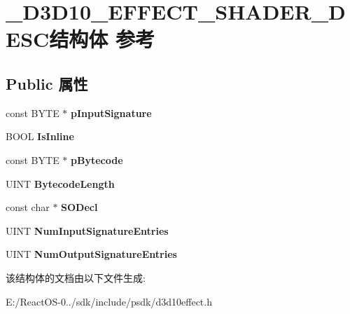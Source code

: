 \hypertarget{struct___d3_d10___e_f_f_e_c_t___s_h_a_d_e_r___d_e_s_c}{}\section{\+\_\+\+D3\+D10\+\_\+\+E\+F\+F\+E\+C\+T\+\_\+\+S\+H\+A\+D\+E\+R\+\_\+\+D\+E\+S\+C结构体 参考}
\label{struct___d3_d10___e_f_f_e_c_t___s_h_a_d_e_r___d_e_s_c}
\subsection*{Public 属性}
\begin{DoxyCompactItemize}
\item 
\mbox{\label{struct___d3_d10___e_f_f_e_c_t___s_h_a_d_e_r___d_e_s_c_a4fd67d667c8f68c9817f30500d031fee}} 
const B\+Y\+TE $\ast$ {\bfseries p\+Input\+Signature}
\item 
\mbox{\label{struct___d3_d10___e_f_f_e_c_t___s_h_a_d_e_r___d_e_s_c_a7452b037d181222f3ae5043bc255ec4f}} 
B\+O\+OL {\bfseries Is\+Inline}
\item 
\mbox{\label{struct___d3_d10___e_f_f_e_c_t___s_h_a_d_e_r___d_e_s_c_a0302749454dadc169c7eacf8cbc0e5aa}} 
const B\+Y\+TE $\ast$ {\bfseries p\+Bytecode}
\item 
\mbox{\label{struct___d3_d10___e_f_f_e_c_t___s_h_a_d_e_r___d_e_s_c_a2a4649d19934b07fd6e5aa68f75b7814}} 
U\+I\+NT {\bfseries Bytecode\+Length}
\item 
\mbox{\label{struct___d3_d10___e_f_f_e_c_t___s_h_a_d_e_r___d_e_s_c_adeb87d411ea71ac5027e38666d0dde5f}} 
const char $\ast$ {\bfseries S\+O\+Decl}
\item 
\mbox{\label{struct___d3_d10___e_f_f_e_c_t___s_h_a_d_e_r___d_e_s_c_a3801488229e9ccf20c67c1be157a4337}} 
U\+I\+NT {\bfseries Num\+Input\+Signature\+Entries}
\item 
\mbox{\label{struct___d3_d10___e_f_f_e_c_t___s_h_a_d_e_r___d_e_s_c_afb4c67ec032a7a1b9e5b805e8749b1df}} 
U\+I\+NT {\bfseries Num\+Output\+Signature\+Entries}
\end{DoxyCompactItemize}


该结构体的文档由以下文件生成\+:\begin{DoxyCompactItemize}
\item 
E\+:/\+React\+O\+S-\/0../sdk/include/psdk/d3d10effect.\+h\end{DoxyCompactItemize}
